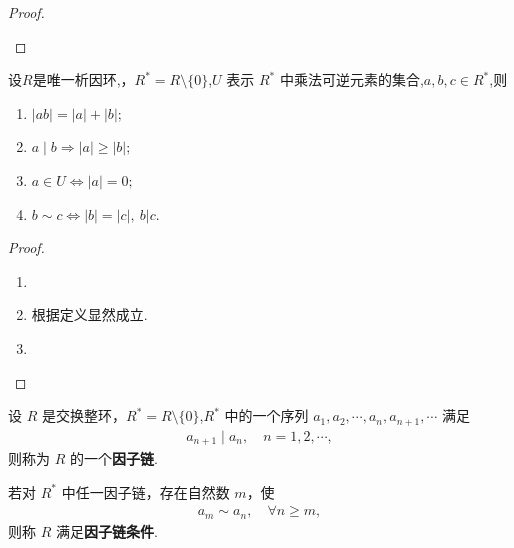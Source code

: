 \documentclass[../../main.tex]{subfiles}%
\begin{document}
\begin{proof}
\begin{enumerate}[(1)]
\end{enumerate}

\end{proof}

\begin{theorem}\label{theorem:UFD中元素的长度的基本性质}
设$R$是唯一析因环,，\( R^* = R \setminus \{0\} \),\( U \) 表示 \( R^* \) 中乘法可逆元素的集合,$a,b,c\in R^*$,则
\begin{enumerate}[(1)]
\item\label{theorem:UFD中元素的长度的基本性质-1} $|ab|=|a|+|b|;$

\item\label{theorem:UFD中元素的长度的基本性质-4} $a\mid b\Longrightarrow |a|\geqslant |b|;$

\item\label{theorem:UFD中元素的长度的基本性质-2} $a \in U \iff |a| = 0;$

\item\label{theorem:UFD中元素的长度的基本性质-3} $b \sim c \iff |b| = |c|,\ b|c.$
\end{enumerate}
\end{theorem}
\begin{proof}
\begin{enumerate}[(1)]
\item 

\item 根据定义显然成立.

\item 
\end{enumerate}

\end{proof}

\begin{definition}
设 \( R \) 是交换整环，\( R^* = R \setminus \{0\} \),\( R^* \) 中的一个序列 \( a_1, a_2, \cdots, a_n, a_{n+1}, \cdots \) 满足
\begin{align*}
a_{n+1} \mid a_n, \quad n = 1, 2, \cdots,
\end{align*}
则称为 \( R \) 的一个\textbf{因子链}.

若对 \( R^* \) 中任一因子链，存在自然数 \( m \)，使
\begin{align*}
a_m \sim a_n, \quad \forall n \geqslant m,
\end{align*}
则称 \( R \) 满足\textbf{因子链条件}.
\end{definition}
\end{document}
